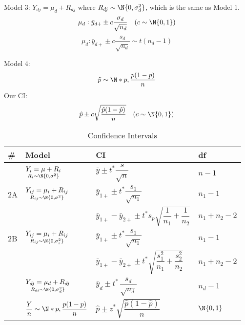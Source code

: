\begin{Example}{}{}
    Model 3: $ Y_{dj}=\mu_d+R_{dj} $ where $ R_{dj} \sim \N{0,\sigma^2_d} $,
    which is the same as Model 1.
    \[ \mu_d:\bar{y}_{d+}\pm c \frac{\sigma_d}{\sqrt{n_d}}\quad (c \sim \N{0,1})  \]
    \[ \mu_d:\bar{y}_{d+} \pm c \frac{s_d}{\sqrt{n_d}}\sim t(n_d-1)  \]
\end{Example}
\begin{Example}{}{}
    Model 4:
    \[ \tilde{p} \sim \N*{p,\frac{p(1-p)}{n}} \]
    Our CI\@:
    \[ \hat{p}\pm c\sqrt{\frac{\hat{p}(1-\hat{p})}{n}}\quad(c \sim \N{0,1}) \]
\end{Example}
\begin{table}[!htbp]
    \centering
    \caption{Confidence Intervals}
    \begin{tabularx}{0.95\linewidth}{@{}>{\hsize}YYYY@{}}
        \toprule
        \# & Model                                                            & CI                                                                               & df            \\
          & $ \underset{R_i \sim \N{0,\sigma^2}}{Y_i=\mu+R_i} $              & $ \bar{y}\pm t^* \dfrac{s}{\sqrt{n}} $                                           & $ n-1 $       \\
        \midrule
        2A & $ \underset{R_{ij} \sim \N{0,\sigma^2}}{Y_{ij}=\mu_i+R_{ij}} $   & $ \bar{y}_{1+} \pm t^*\dfrac{s_1}{\sqrt{n_1}} $                                  & $ n_1-1 $     \\
           &                                                                  & $ \bar{y}_{1+}-\bar{y}_{2+}\pm t^* s_p\sqrt{\dfrac{1}{n_1}+\dfrac{1}{n_2}} $     & $ n_1+n_2-2 $ \\
        \midrule
        2B & $ \underset{R_{ij} \sim \N{0,\sigma_i^2}}{Y_{ij}=\mu_i+R_{ij}} $ & $ \bar{y}_{1+} \pm t^*\dfrac{s_1}{\sqrt{n_1}} $                                  & $ n_1-1 $     \\
           &                                                                  & $ \bar{y}_{1+}-\bar{y}_{2+}\pm t^*\sqrt{\dfrac{s_1^2}{n_1}+\dfrac{s_2^2}{n_2}} $ & $ n_1+n_2-2 $ \\
          & $ \underset{R_{dj} \sim \N{0,\sigma_d^2}}{Y_{dj}=\mu_d+R_{dj}} $ & $ \bar{y}_d\pm t^*\, \dfrac{s_d}{\sqrt{n_d}}  $                                  & $ n_d-1 $     \\
          & $ \dfrac{Y}{n}\sim \N*{p,\dfrac{p(1-p)}{n}} $                    & $ \hat{p}\pm z^*\sqrt{\dfrac{\hat{p}(1-\hat{p})}{n}} $                           & $ \N{0,1} $
    \end{tabularx}
\end{table}


